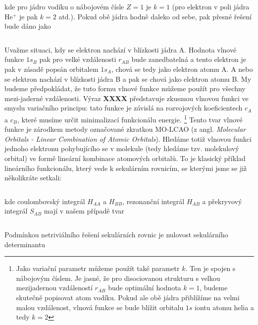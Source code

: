 \begin{equation}
\label{rov:XXX}
\end{equation}

\noindent kde pro jádro vodíku o nábojovém čísle $Z=1$ je $k=1$ (pro elektron v poli jádra He$^+$ je pak $k=2$ atd.). Pokud obě jádra hodně daleko od sebe, pak přesné řešení bude dáno jako

\begin{equation}
\label{rov:XXX}
\end{equation}

Uvažme situaci, kdy se elektron nachází v blízkosti jádra A. Hodnota vlnové funkce $1s_B$ pak pro velké vzdálenosti $r_{AB}$ bude zanedbatelná a tento elektron je pak v zásadě popsán orbitalem $1s_A$, chová se tedy jako elektron atomu A. A nebo se elektron nachází v blízkosti jádra B a pak se chová jako elektron atomu B. My budeme předpokládat, že tuto formu vlnové funkce můžeme použít pro všechny mezi-jaderné vzdálenosti. Výraz \textbf{XXXX} představuje zkusmou vlnovou funkci ve smyslu variačního principu: tato funkce je závislá na rozvojových koeficientech $c_A$ a $c_B$, které musíme určit minimalizací funkcionálu energie. \footnote{Jako variační parametr můžeme použít také parametr $k$. Ten je spojen s nábojovým číslem. Je jasné, že pro disociovanou strukturu s velkou mezijadernou vzdáleností $r_{AB}$ bude optimální hodnota $k=1$, budeme skutečně popisovat atom vodíku. Pokud ale obě jádra přiblížíme na velmi malou vzdálenost, vlnová funkce se bude blížit orbitalu $1s$ iontu atomu helia a tedy $k=2$} Tento tvar vlnové funkce je zárodkem metody označované zkratkou MO-LCAO (z angl. \textit{Molecular Orbitals - Linear Combination of Atomic Orbitals}). Hledáme totiž vlnovou funkci jednoho elektronu pohybujícího se v molekule (tedy hledáme tzv. molekulový orbital) ve formě lineární kombinace atomových orbitalů. To je klasický příklad lineárního funkcionálu, který vede k sekulárním rovnicím, se kterými jsme se již několikráte setkali:


\begin{equation}
\label{rov:XXX}
\end{equation}

\noindent kde coulombovský integrál $H_{AA}$ a $H_{BB}$, rezonanční integrál $H_{AB}$ a překryvový integrál $S_{AB}$ mají v našem případě tvar

\begin{equation}
\label{rov:XXX}
\end{equation}

Podmínkou netriviálního řešení sekulárních rovnic je nulovost sekulárního determinantu


